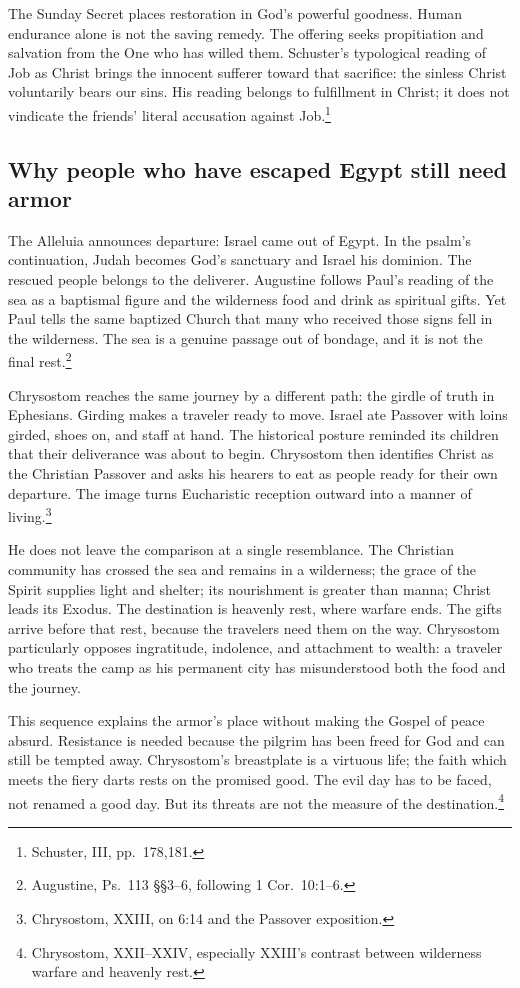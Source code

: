 The Sunday Secret places restoration in God's powerful goodness.
Human endurance alone is not the saving remedy. The offering seeks
propitiation and salvation from the One who has willed them. Schuster's
typological reading of Job as Christ brings the innocent sufferer
toward that sacrifice: the sinless Christ voluntarily bears our sins.
His reading belongs to fulfillment in Christ; it does not vindicate
the friends' literal accusation against Job.\footnote{Schuster,
 III, pp.~178,181.}

\subsection{Why people who have escaped Egypt still need armor}
The Alleluia announces departure: Israel came out of Egypt. In the
psalm's continuation, Judah becomes God's sanctuary and Israel his
dominion. The rescued people belongs to the deliverer. Augustine
follows Paul's reading of the sea as a baptismal figure and the
wilderness food and drink as spiritual gifts. Yet Paul tells the
same baptized Church that many who received those signs fell in the
wilderness. The sea is a genuine passage out of bondage, and it is
not the final rest.\footnote{Augustine, Ps.~113 \S\S3--6,
following 1 Cor.~10:1--6.}

Chrysostom reaches the same journey by a different path: the girdle
of truth in Ephesians. Girding makes a traveler ready to move. Israel
ate Passover with loins girded, shoes on, and staff at hand. The
historical posture reminded its children that their deliverance was
about to begin. Chrysostom then identifies Christ as the Christian
Passover and asks his hearers to eat as people ready for their own
departure. The image turns Eucharistic reception outward into a
manner of living.\footnote{Chrysostom,  XXIII,
on 6:14 and the Passover exposition.}

He does not leave the comparison at a single resemblance. The
Christian community has crossed the sea and remains in a wilderness;
the grace of the Spirit supplies light and shelter; its nourishment
is greater than manna; Christ leads its Exodus. The destination is
heavenly rest, where warfare ends. The gifts arrive before that rest,
because the travelers need them on the way. Chrysostom particularly
opposes ingratitude, indolence, and attachment to wealth: a traveler
who treats the camp as his permanent city has misunderstood both
the food and the journey.

This sequence explains the armor's place without making the Gospel
of peace absurd. Resistance is needed because the pilgrim has been
freed for God and can still be tempted away. Chrysostom's breastplate
is a virtuous life; the faith which meets the fiery darts rests on
the promised good. The evil day has to be faced, not renamed a good
day. But its threats are not the measure of the destination.\footnote{Chrysostom,  XXII--XXIV, especially XXIII's
contrast between wilderness warfare and heavenly rest.}

